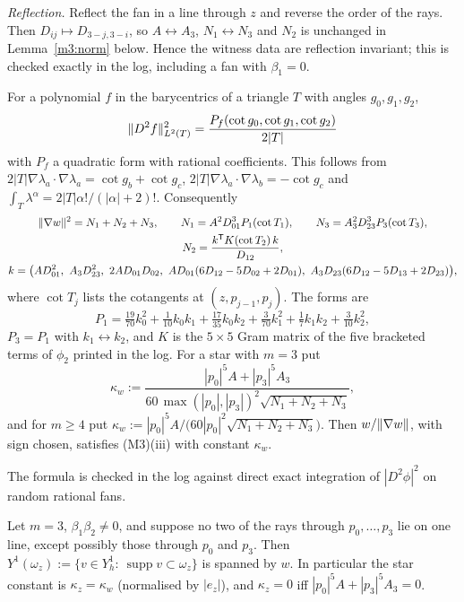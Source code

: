 \emph{Reflection.} Reflect the fan in a line through $z$ and reverse the order of the rays. Then $D_{ij}\mapsto D_{3-j,3-i}$, so $A\leftrightarrow A_3$, $N_1\leftrightarrow N_3$ and $N_2$ is unchanged in Lemma~\ref{m3:norm} below. Hence the witness data are reflection invariant; this is checked exactly in the log, including a fan with $\beta_1=0$.

\begin{lemma}\label{m3:norm}
For a polynomial $f$ in the barycentrics of a triangle $T$ with angles $g_0,g_1,g_2$,
\[
\lVert D^2f\rVert_{L^2(T)}^2=\frac{P_f(\cot g_0,\cot g_1,\cot g_2)}{2|T|}
\]
with $P_f$ a quadratic form with rational coefficients. This follows from $2|T|\nabla\lambda_a\cdot\nabla\lambda_a=\cot g_b+\cot g_c$, $2|T|\nabla\lambda_a\cdot\nabla\lambda_b=-\cot g_c$ and $\int_T\lambda^\alpha=2|T|\alpha!/(|\alpha|+2)!$. Consequently
\begin{gather*}
\norm{\nabla w}^2=N_1+N_2+N_3,\qquad N_1=A^2D_{01}^3P_1(\cot T_1),\qquad N_3=A_3^2D_{23}^3P_3(\cot T_3),\\ N_2=\frac{k^{\mathsf T}K(\cot T_2)\,k}{D_{12}},\\
k=\bigl(AD_{01}^2,\ A_3D_{23}^2,\ 2AD_{01}D_{02},\ AD_{01}(6D_{12}-5D_{02}+2D_{01}),\ A_3D_{23}(6D_{12}-5D_{13}+2D_{23})\bigr),
\end{gather*}
where $\cot T_j$ lists the cotangents at $(z,p_{j-1},p_j)$. The forms are
\[
P_1=\tfrac{19}{70}k_0^2+\tfrac1{10}k_0k_1+\tfrac{17}{35}k_0k_2+\tfrac3{70}k_1^2+\tfrac17k_1k_2+\tfrac3{10}k_2^2,
\]
$P_3=P_1$ with $k_1\leftrightarrow k_2$, and $K$ is the $5\times5$ Gram matrix of the five bracketed terms of $\phi_2$ printed in the log. For a star with $m=3$ put
\[
\kappa_w:=\frac{|p_0|^5A+|p_3|^5A_3}{60\,\max(|p_0|,|p_3|)^2\sqrt{N_1+N_2+N_3}},
\]
and for $m\ge4$ put $\kappa_w:=|p_0|^5A/\bigl(60|p_0|^2\sqrt{N_1+N_2+N_3}\bigr)$. Then $w/\lVert \nabla w\rVert$, with sign chosen, satisfies (M3)(iii) with constant $\kappa_w$.
\end{lemma}

The formula is checked in the log against direct exact integration of $|D^2\phi|^2$ on random rational fans.

\begin{lemma}[Uniqueness for $m=3$]\label{m3:dim}
Let $m=3$, $\beta_1\beta_2\ne0$, and suppose no two of the rays through $p_0,\dots,p_3$ lie on one line, except possibly those through $p_0$ and $p_3$. Then $Y^1(\omega_z):=\{v\in Y_h^1:\ \operatorname{supp}v\subset\omega_z\}$ is spanned by $w$. In particular the star constant is $\kappa_z=\kappa_w$ (normalised by $|e_z|$), and $\kappa_z=0$ iff $|p_0|^5A+|p_3|^5A_3=0$.
\end{lemma}

